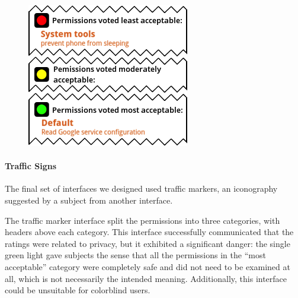 \documentclass[11pt]{article}
\begin{document}
\begin{figure}
\begin{center}
\includegraphics[width=.9\linewidth]{candidate-img/traffic/trafficR2.png}
\end{center}
\end{figure}

\paragraph{Traffic Signs}
\label{s-sec-traffic}

The final set of interfaces we designed used traffic markers, 
an iconography suggested by a subject from another interface.

\label{ss-sec-traffic-r2}

The traffic marker interface split the permissions into three categories, with headers above
each category.
This interface successfully communicated that the ratings were related to privacy, 
but it exhibited a significant danger: the single green light gave subjects
the sense that all the permissions in the ``most acceptable'' category were 
completely safe and did
not need to be examined at all, which is not necessarily the
intended meaning. Additionally, this interface 
could be unsuitable for colorblind users.
\end{document}
